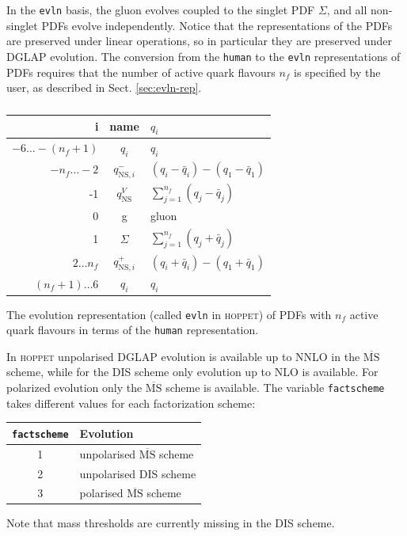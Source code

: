 \documentclass[12pt]{article}
\newcommand{\MSbar}{\overline{\mathrm{MS}}}
\newcommand{\hoppet}{\textsc{hoppet}\xspace}
\newcommand{\ttt}[1]{\texttt{#1}}
\begin{document}
In the {\tt evln} basis, 
the gluon evolves coupled to the singlet  PDF $\Sigma$,
and all non-singlet PDFs evolve independently.
Notice that the representations of the PDFs
are preserved under linear operations, so in particular
they are preserved under DGLAP evolution.
The conversion from the \ttt{human} to the \ttt{evln}
representations of PDFs requires that the number of
active quark flavours $n_f$ is specified by the user, as described in
Sect. \ref{sec:evln-rep}.

\begin{table}
\begin{center}
\begin{tabular}{|r | c | l |}
\hline
     i & \mbox{name} & $q_i$ \\ \hline
     $ -6\ldots-(n_f+1)$ & $q_i$ & $q_i$\\
     $-n_f\ldots -2$ & $q_{\mathrm{NS},i}^{-}$ & 
$(q_i -  {\bar q}_i) - (q_1 - {\bar q}_1)$\\
      -1           & $q_{\mathrm{NS}}^{V}$ & 
$\sum_{j=1}^{n_f} (q_j -  {\bar q}_j)$\\
       0           & g & \textrm{gluon} \\
       1           & $\Sigma$ & $\sum_{j=1}^{n_f} (q_j +  {\bar q}_j)$\\
     $2\ldots n_f$ & $q_{\mathrm{NS},i}^{+}$ &
$ (q_i +  {\bar q}_i) - (q_1 + {\bar q}_1)$\\
      $(n_f+1)\ldots6$ & $q_i$ & $q_i$ \\
\hline
\end{tabular}
\caption{}{\label{eq:diag_split} The evolution representation 
(called \ttt{evln} in \hoppet)
of PDFs with $n_f$ active quark flavours
in terms of the \ttt{human} representation.}  
\end{center}
\end{table}

In \hoppet unpolarised DGLAP evolution is available up to NNLO
in the $\MSbar$ scheme, while for the DIS scheme
only evolution up to NLO is available. For polarized evolution only
the $\MSbar$ scheme is available. The variable \ttt{factscheme}
takes different values for each factorization scheme:
\begin{center}
  \begin{tabular}{|c|l|}\hline
    \ttt{factscheme} & Evolution\\[2pt]\hline
    1 & unpolarised $\MSbar$ scheme\\[2pt]\hline
    2 & unpolarised DIS scheme\\[2pt]\hline
    3 & polarised $\MSbar$ scheme\\\hline
  \end{tabular}
\end{center}
Note that mass thresholds are currently
missing in the DIS scheme.
\end{document}
